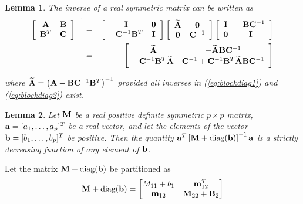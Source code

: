 \documentclass[11pt]{article}
\newtheorem{Lemma}{Lemma}
\newtheorem{Main Result}{Main Result}
\def\vectorfontone{\bf}
\def\va{{\vectorfontone a}}                      %
\def\vb{{\vectorfontone b}}                      %
\def\vm{{\vectorfontone m}}                      %
\def\vzero{{\vectorfontone 0}}
\def\matrixfontone{\bf}
\def\mA{{\matrixfontone A}}                      %
\def\mB{{\matrixfontone B}}                      %
\def\mC{{\matrixfontone C}}                      %
\def\mI{{\matrixfontone I}}                      %
\def\mM{{\matrixfontone M}}                      %
\def\ds{\displaystyle}
\def\diag{\text{diag}}
\begin{document}
\begin{Lemma}\label{lem:2}
	The inverse of a real symmetric matrix can be written as
	\begin{eqnarray}
	\ds \left[ \begin{array}{cc}
	\mA   & \mB \\
	\mB^T & \mC
	\end{array} \right]^{-1}
	&  = &
	\ds \left[ \begin{array}{cc}
	\mI & \vzero \\
	-\mC^{-1}\mB^T &  \mI
	\end{array} \right]
	\left[ \begin{array}{cc}
	\widetilde{\mA} & \vzero \\
	\vzero & \mC^{-1}
	\end{array} \right]
	\left[ \begin{array}{cc}
	\mI    & -\mB\mC^{-1}\\
	\vzero & \mI
	\end{array} \right] \label{eq:blockdiag1}\\
	&  = &
	\ds\left[
	\begin{array}{cc}
	\widetilde{\mA}
	& - \widetilde{\mA}\mB\mC^{-1} \\
	-\mC^{-1}\mB^T\widetilde{\mA}
	& \mC^{-1} + \mC^{-1}\mB^T\widetilde{\mA}\mB\mC^{-1}
	\end{array}\right]\label{eq:blockdiag2}
	\end{eqnarray}
	
	\noindent where $\widetilde{\mA} = \left(\mA-\mB\mC^{-1}\mB^T\right)^{-1}$
	provided all inverses in (\ref{eq:blockdiag1}) and
	(\ref{eq:blockdiag2}) exist.
\end{Lemma}


\begin{Lemma}\label{lem:3}
	Let $\mM$ be a real positive definite symmetric $p\times p$ matrix,
	$\va = [a_1,\ldots,a_p]^T$ be a real vector, and let the elements of the vector
	$\vb = [b_1,\ldots,b_p]^T$ be positive. Then the quantity
	$\va^T\left[\mM + \diag(\vb)\right]^{-1}\va$ is a strictly decreasing function
	of any element of $\vb$.
\end{Lemma}


 Let the matrix $\mM + \diag(\vb)$ be partitioned as
$$
\mM + \diag(\vb) =
\begin{bmatrix}
M_{11} + b_1 & \vm^T_{12} \\
\vm_{12}   & \mM_{22} + \mB_2
\end{bmatrix}
$$
\end{document}
